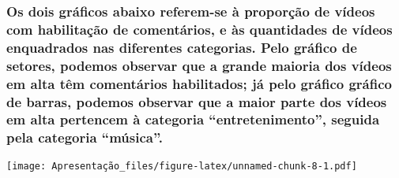 \documentclass[]{article}
\newenvironment{Shaded}{\begin{snugshade}}{\end{snugshade}}
\newcommand{\DataTypeTok}[1]{\textcolor[rgb]{0.13,0.29,0.53}{#1}}
\newcommand{\DecValTok}[1]{\textcolor[rgb]{0.00,0.00,0.81}{#1}}
\newcommand{\KeywordTok}[1]{\textcolor[rgb]{0.13,0.29,0.53}{\textbf{#1}}}
\newcommand{\NormalTok}[1]{#1}
\newcommand{\StringTok}[1]{\textcolor[rgb]{0.31,0.60,0.02}{#1}}
\begin{document}
\hypertarget{os-dois-graficos-abaixo-referem-se-a-proporcao-de-videos-com-habilitacao-de-comentarios-e-as-quantidades-de-videos-enquadrados-nas-diferentes-categorias.-pelo-grafico-de-setores-podemos-observar-que-a-grande-maioria-dos-videos-em-alta-tem-comentarios-habilitados-ja-pelo-grafico-grafico-de-barras-podemos-observar-que-a-maior-parte-dos-videos-em-alta-pertencem-a-categoria-entretenimento-seguida-pela-categoria-musica.}{%
\subsubsection{Os dois gráficos abaixo referem-se à proporção de vídeos
com habilitação de comentários, e às quantidades de vídeos enquadrados
nas diferentes categorias. Pelo gráfico de setores, podemos observar que
a grande maioria dos vídeos em alta têm comentários habilitados; já pelo
gráfico gráfico de barras, podemos observar que a maior parte dos vídeos
em alta pertencem à categoria ``entretenimento'', seguida pela categoria
``música''.}\label{os-dois-graficos-abaixo-referem-se-a-proporcao-de-videos-com-habilitacao-de-comentarios-e-as-quantidades-de-videos-enquadrados-nas-diferentes-categorias.-pelo-grafico-de-setores-podemos-observar-que-a-grande-maioria-dos-videos-em-alta-tem-comentarios-habilitados-ja-pelo-grafico-grafico-de-barras-podemos-observar-que-a-maior-parte-dos-videos-em-alta-pertencem-a-categoria-entretenimento-seguida-pela-categoria-musica.}}

\begin{Shaded}
\end{Shaded}

\texttt{[image: Apresentação\_files/figure-latex/unnamed-chunk-8-1.pdf]}
\end{document}
